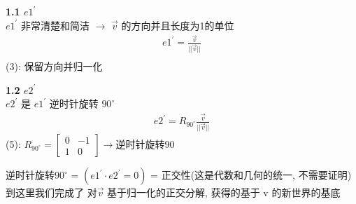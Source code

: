 \documentclass[12pt]{article}
\begin{document}
\begin{flushleft}
\begin{itemize}
              \vspace{0.3em}
              \textbf{1.1 $e1^{'}$} \\
              $e1^{'}$ 非常清楚和简洁 $\to$  $\vec{v}$ 的方向并且长度为1的单位 \\
              \begin{align}
                  e1^{'} = \frac{\vec{v}}{||\vec{v}||} \\
              \end{align}
              (3): 保留方向并归一化


              \vspace{0.3em}
              \textbf{1.2 $e2^{'}$} \\
              $e2^{'}$ 是 $e1^{'}$ 逆时针旋转 $90^{\circ}$  \\
              \begin{align}
                  e2^{'} = R_{90^{\circ}}\frac{\vec{v}}{||\vec{v}||}
              \end{align}
              (5): $R_{90^{\circ}} = \begin{bmatrix}
                      0 & -1 \\
                      1 & 0
                  \end{bmatrix} \to $逆时针旋转90

              \vspace{0.3em}

              逆时针旋转$90^{\circ}$ = $(e1^{'} \cdot e2^{'} = 0)$ = 正交性(这是代数和几何的统一, 不需要证明) \\
              到这里我们完成了 对$\vec{v}$ 基于归一化的正交分解, 获得的基于 v 的新世界的基底


\end{itemize}
\end{flushleft}
\end{document}
